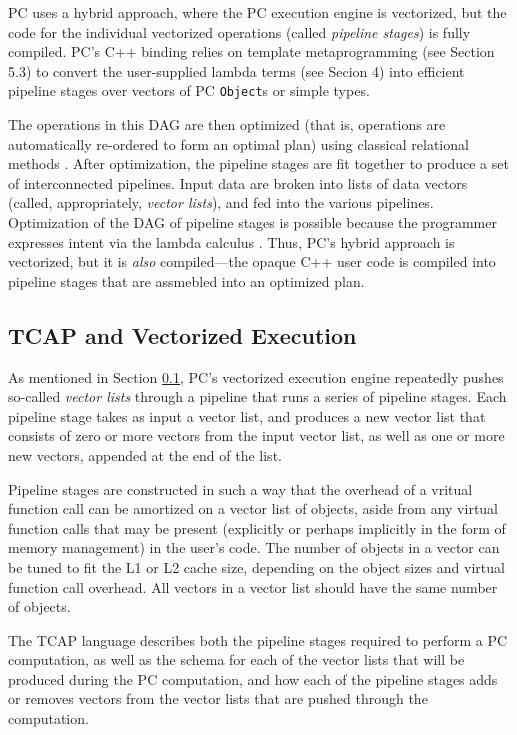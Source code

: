 PC uses a hybrid approach, where the PC execution engine is vectorized, but the code for the individual vectorized operations (called \emph{pipeline stages})
is fully compiled.  PC's C++ binding relies on template metaprogramming (see Section 5.3)
to convert the user-supplied lambda terms 
(see Secion 4) into efficient pipeline stages over vectors of PC
\texttt{Object}s or simple types.

The operations in this DAG are then
optimized (that is, operations are automatically
re-ordered to form an optimal plan) using classical relational
methods \cite{chaudhuri1998overview, graefe1995cascades, jarke1984query}. After optimization, the pipeline stages are fit together to produce a set of interconnected pipelines.  Input data are broken into lists of 
data vectors (called, appropriately, \emph{vector lists}), and fed into the various pipelines.
Optimization of the DAG of pipeline stages
is possible because the programmer expresses intent via the lambda calculus \cite{barendregt1984lambda, moggi1989computational}.
Thus, PC's hybrid approach is vectorized, 
but it is \emph{also} compiled---the opaque C++ user code is compiled into pipeline stages that are 
assmebled into an optimized plan.




\subsection{TCAP and Vectorized Execution} \label{sec:vectorized}

As mentioned in Section \ref{sec:vectorized}, PC's vectorized execution engine repeatedly pushes 
so-called \emph{vector lists} through a pipeline that runs a series of
pipeline stages.  Each pipeline stage
takes as input a vector list,
and produces a 
new vector list that consists of zero or more vectors from the input
vector list, as well as one or more new vectors, appended at the end
of the list.

Pipeline stages are constructed in such a way that the overhead of a
vritual function call can be amortized on a vector list of objects, aside from any virtual function calls that may be
present (explicitly or perhaps implicitly in the form of memory
management) in the user's code.
The number of objects in a vector can be tuned to fit the L1 or
L2 cache size, depending on the object sizes and virtual function call
overhead. All vectors in a vector list should have the same number of objects.

The TCAP language describes both the pipeline stages required to perform a PC computation, as well as the schema for each of the vector lists that
will be produced during the PC computation, and how each of the pipeline stages adds or removes vectors from the vector lists that are pushed through
the computation.

